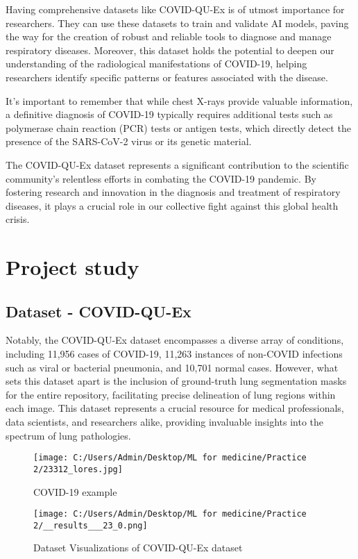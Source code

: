 \documentclass{article}
\begin{document}
Having comprehensive datasets like COVID-QU-Ex is of utmost importance for researchers. They can use these datasets to train and validate AI models, paving the way for the creation of robust and reliable tools to diagnose and manage respiratory diseases. Moreover, this dataset holds the potential to deepen our understanding of the radiological manifestations of COVID-19, helping researchers identify specific patterns or features associated with the disease.

It's important to remember that while chest X-rays provide valuable information, a definitive diagnosis of COVID-19 typically requires additional tests such as polymerase chain reaction (PCR) tests or antigen tests, which directly detect the presence of the SARS-CoV-2 virus or its genetic material.

The COVID-QU-Ex dataset represents a significant contribution to the scientific community's relentless efforts in combating the COVID-19 pandemic. By fostering research and innovation in the diagnosis and treatment of respiratory diseases, it plays a crucial role in our collective fight against this global health crisis.
\section{Project study}
\subsection{Dataset - COVID-QU-Ex}
Notably, the COVID-QU-Ex dataset encompasses a diverse array of conditions, including 11,956 cases of COVID-19, 11,263 instances of non-COVID infections such as viral or bacterial pneumonia, and 10,701 normal cases. 
However, what sets this dataset apart is the inclusion of ground-truth lung segmentation masks for the entire repository, facilitating precise delineation of lung regions within each image. 
This dataset represents a crucial resource for medical professionals, data scientists, and researchers alike, providing invaluable insights into the spectrum of lung pathologies. 

\begin{figure}[htbp]
    \centering
    \texttt{[image: C:/Users/Admin/Desktop/ML for medicine/Practice 2/23312\_lores.jpg]}
    \caption{COVID-19 example}
    \label{fig:example}
\end{figure}
\begin{figure}[htbp]
    \centering
    \texttt{[image: C:/Users/Admin/Desktop/ML for medicine/Practice 2/\_\_results\_\_\_23\_0.png]}
    \caption{Dataset Visualizations of COVID-QU-Ex dataset}
    \label{fig:visual}
\end{figure}
\end{document}
